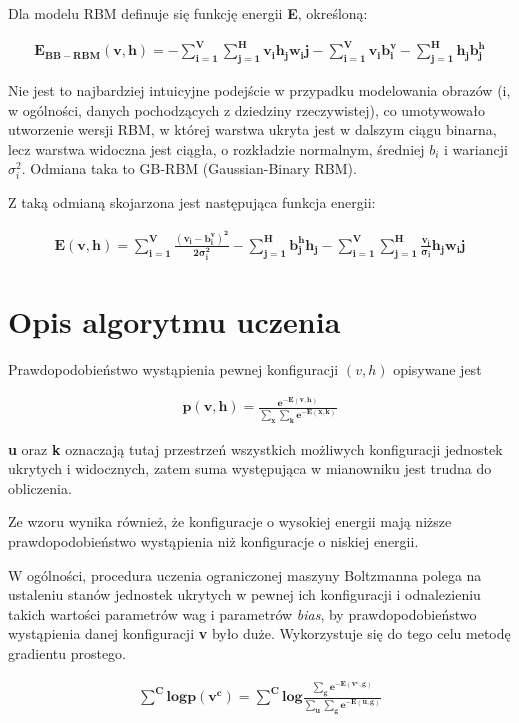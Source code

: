 \documentclass[a4paper,10pt]{report}
\begin{document}
Dla modelu RBM definuje się funkcję energii \textbf{E}, określoną:

\begin{align}
	\mathbf{E_{BB-RBM}(v,h) = - \sum_{i=1}^{V} \sum_{j=1}^{H} v_i h_j w_ij - \sum_{i=1}^{V} v_i b_i^v - \sum_{j=1}^{H} h_j b_j^h}
\end{align}

Nie jest to najbardziej intuicyjne podejście w przypadku modelowania obrazów (i, w ogólności, danych pochodzących z dziedziny rzeczywistej), co umotywowało utworzenie wersji RBM, w której warstwa ukryta jest w dalszym ciągu binarna, lecz warstwa widoczna jest ciągła, o rozkładzie normalnym, średniej $b_i$ i wariancji $\sigma^2_i$. Odmiana taka to GB-RBM (Gaussian-Binary RBM).

Z taką odmianą skojarzona jest następująca funkcja energii:

\begin{align}
	\mathbf{E(v,h) = \sum_{i=1}^{V} \frac{(v_i - b_i^v)^2}{2\sigma_i^2} - \sum_{j=1}^{H} b_j^h h_j - \sum_{i=1}^{V} \sum_{j=1}^{H} \frac{v_i}{\sigma_i} h_j w_ij}
\end{align}

\section{Opis algorytmu uczenia}

Prawdopodobieństwo wystąpienia pewnej konfiguracji $(v, h)$ opisywane jest 

\begin{align}
	\mathbf{p(v,h) = \frac{e^{-E(v,h)}}{\sum_x \sum_k e^{-E(x,k)}}}
\end{align}

\textbf{u} oraz \textbf{k} oznaczają tutaj przestrzeń wszystkich możliwych konfiguracji jednostek ukrytych i widocznych, zatem suma występująca w mianowniku jest trudna do obliczenia.

Ze wzoru wynika również, że konfiguracje o wysokiej energii mają niższe prawdopodobieństwo wystąpienia niż konfiguracje o niskiej energii.

W ogólności, procedura uczenia ograniczonej maszyny Boltzmanna polega na ustaleniu stanów jednostek ukrytych w pewnej ich konfiguracji i odnalezieniu takich wartości parametrów wag i parametrów \textit{bias}, by prawdopodobieństwo wystąpienia danej konfiguracji \textbf{v} było duże. Wykorzystuje się do tego celu metodę gradientu prostego.

\begin{align}
 \mathbf{\sum^{C} log p(v^c) = \sum^{C} log \frac{\sum_g e^{-E(v^c, g)}}{\sum_u \sum_g e^{-E(u,g)}}}
\end{align}
\end{document}

